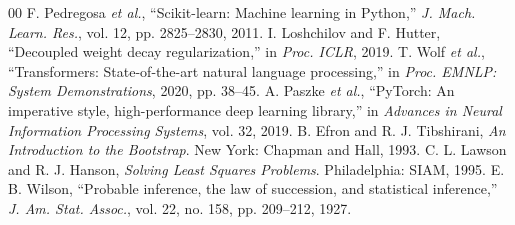 \documentclass[conference]{IEEEtran}
\begin{document}
\begin{thebibliography}{00}
 F. Pedregosa \textit{et al.}, ``Scikit-learn: Machine learning in Python,'' \textit{J. Mach. Learn. Res.}, vol. 12, pp. 2825--2830, 2011.
 I. Loshchilov and F. Hutter, ``Decoupled weight decay regularization,'' in \textit{Proc. ICLR}, 2019.
 T. Wolf \textit{et al.}, ``Transformers: State-of-the-art natural language processing,'' in \textit{Proc. EMNLP: System Demonstrations}, 2020, pp. 38--45.
 A. Paszke \textit{et al.}, ``PyTorch: An imperative style, high-performance deep learning library,'' in \textit{Advances in Neural Information Processing Systems}, vol. 32, 2019.
 B. Efron and R. J. Tibshirani, \textit{An Introduction to the Bootstrap}. New York: Chapman and Hall, 1993.
 C. L. Lawson and R. J. Hanson, \textit{Solving Least Squares Problems}. Philadelphia: SIAM, 1995.
 E. B. Wilson, ``Probable inference, the law of succession, and statistical inference,'' \textit{J. Am. Stat. Assoc.}, vol. 22, no. 158, pp. 209--212, 1927.
\end{thebibliography}
\end{document}
